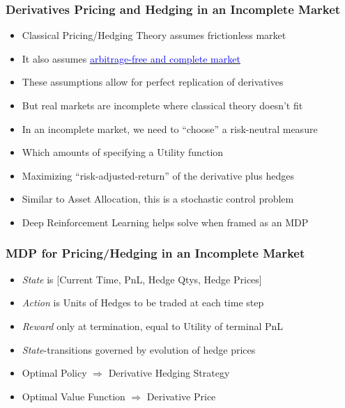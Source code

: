 \documentclass[handout]{beamer}
\begin{document}
\begin{frame}
\frametitle{Derivatives Pricing and Hedging in an Incomplete Market}
\pause
\begin{itemize}[<+->]
\item Classical Pricing/Hedging Theory assumes frictionless market
\item It also assumes \href{https://github.com/coverdrive/technical-documents/blob/master/finance/ArbitrageCompleteness.pdf}{\underline{\textcolor{blue}{arbitrage-free and complete market}}}
\item These assumptions allow for perfect replication of derivatives
\item But real markets are incomplete where classical theory doesn't fit
\item In an incomplete market, we need to ``choose'' a risk-neutral measure
\item Which amounts of specifying a Utility function
\item Maximizing ``risk-adjusted-return'' of the derivative plus hedges
\item Similar to Asset Allocation, this is a stochastic control problem
\item Deep Reinforcement Learning helps solve when framed as an MDP 
\end{itemize}
\end{frame}

\begin{frame}
\frametitle{MDP for Pricing/Hedging in an Incomplete Market}
\pause
\begin{itemize}[<+->]
\item {\em State} is [Current Time, PnL, Hedge Qtys, Hedge Prices]
\item {\em Action} is Units of Hedges to be traded at each time step
\item {\em Reward} only at termination, equal to Utility of terminal PnL
\item {\em State}-transitions governed by evolution of hedge prices
\item Optimal Policy $\Rightarrow$ Derivative Hedging Strategy
\item Optimal Value Function $\Rightarrow$ Derivative Price
\end{itemize}
\end{frame}
\end{document}
